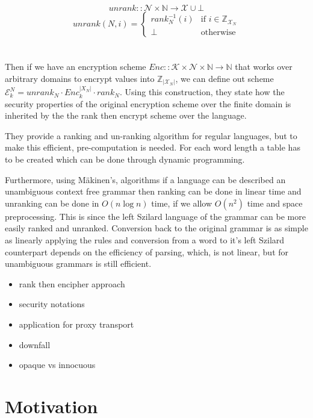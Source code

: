 \documentclass[12pt,a4paper]{article}
\begin{document}
$$ unrank :: \mathcal{N} \times \mathbb{N} \rightarrow \mathcal{X} \cup \bot $$
$$ unrank(N,i) =
\left\{
	\begin{array}{ll}
		rank_N^{-1}(i)  & \mbox{if } i \in \mathbb{Z}_{\mathcal{X}_N}\\
		\bot & \mbox{otherwise} 
	\end{array}
\right.
$$\\\\
Then if we have an encryption scheme $Enc :: \mathcal{K} \times \mathcal{N} \times \mathbb{N} \rightarrow \mathbb{N}$ that works over arbitrary domains to encrypt values into $\mathbb{Z}_{|\mathcal{X}_N|}$, we can define out scheme $\mathcal{E}_k^N = unrank_N \cdot Enc_k^{|X_N|} \cdot rank_N$. Using this construction, they state how the security properties of the original encryption scheme over the finite domain is inherited by the the rank then encrypt scheme over the language.

They provide a ranking and un-ranking algorithm for regular languages, but to make this efficient, pre-computation is needed. For each word length a table has to be created which can be done through dynamic programming.

Furthermore, using M\"akinen's\cite{rankcf}, algorithms if a language can be described an unambiguous context free grammar then ranking can be done in linear time and unranking can be done in $O(n \log n)$ time, if we allow $O(n^2)$ time and space preprocessing. This is since the left Szilard language of the grammar can be more easily ranked and unranked. Conversion back to the original grammar is as simple as linearly applying the rules and conversion from a word to it's left Szilard counterpart depends on the efficiency of parsing, which, is not linear, but for unambiguous grammars is still efficient.

\begin{itemize}
 \item rank then encipher approach
 \item security notations
 \item application for proxy transport
 \item downfall
 \item opaque vs innocuous
\end{itemize}

\pagebreak
\section{Motivation}
\end{document}
